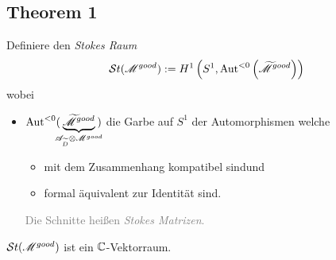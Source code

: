 \pagebreak \subsection{Theorem 1} %
\begin{comment}
  see:
  \begin{itemize}
    \item \cite[29]{Varadarajan96linearmeromorphic}
  \end{itemize}
\end{comment}
\begin{defn}
  Definiere den \emph{Stokes Raum}
  \[
    \mathcal{S}{}t(\mathscr{M}^{good})
      :=H^1\left(S^1,\operatorname{Aut}^{<0}\left(\widetilde {\mathscr{M}}^{good}\right)\right)
  \]
  wobei
  \begin{itemize}
    \item $\operatorname{Aut}^{<0}(\!\!\!\underset{\mathscr{A}_{\widetilde D}\otimes\mathscr{M}^{good}}
      {\underbrace{\widetilde{\mathscr{M}}^{good}}}\!\!\!)$
      die Garbe auf $S^1$ der Automorphismen welche
      \begin{itemize}
        \item mit dem Zusammenhang kompatibel sind\TODO und
        \item formal äquivalent zur Identität sind.
      \end{itemize}
      \textcolor{gray}{Die Schnitte heißen \emph{Stokes Matrizen}.}
  \end{itemize}
  \begin{thm}
    $\mathcal{S}{}t(\mathscr{M}^{good})$ ist ein $\mathbb{C}$-Vektorraum.
  \end{thm}
\end{defn}


